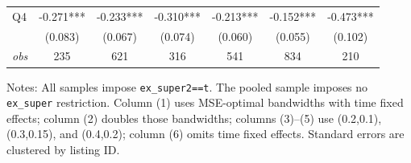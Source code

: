 \begin{table}[!htbp]
\begin{tabular}{lcccccc}
Q4 & -0.271*** & -0.233*** & -0.310*** & -0.213*** & -0.152*** & -0.473*** \\
 & (0.083) & (0.067) & (0.074) & (0.060) & (0.055) & (0.102) \\
\textit{obs} & 235 & 621 & 316 & 541 & 834 & 210 \\
\bottomrule
\end{tabular}
\begin{minipage}{0.98\textwidth}\footnotesize
Notes: All samples impose \texttt{ex\_super2==t}. The pooled sample imposes no \texttt{ex\_super} restriction. Column (1) uses MSE-optimal bandwidths with time fixed effects; column (2) doubles those bandwidths; columns (3)--(5) use (0.2,0.1), (0.3,0.15), and (0.4,0.2); column (6) omits time fixed effects. Standard errors are clustered by listing ID.
\end{minipage}
\end{table}


